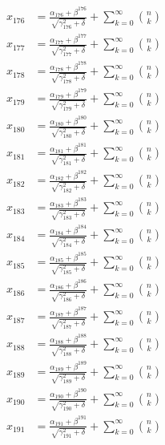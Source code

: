 \documentclass{article}
\begin{document}
\begin{align}
  x_{176} &= \frac{\alpha_{176} + \beta^{176}}{\sqrt{\gamma_{176}^2 + \delta}} + \sum_{k=0}^{\infty} \binom{n}{k} \label{eq:176} \\
  x_{177} &= \frac{\alpha_{177} + \beta^{177}}{\sqrt{\gamma_{177}^2 + \delta}} + \sum_{k=0}^{\infty} \binom{n}{k} \label{eq:177} \\
  x_{178} &= \frac{\alpha_{178} + \beta^{178}}{\sqrt{\gamma_{178}^2 + \delta}} + \sum_{k=0}^{\infty} \binom{n}{k} \label{eq:178} \\
  x_{179} &= \frac{\alpha_{179} + \beta^{179}}{\sqrt{\gamma_{179}^2 + \delta}} + \sum_{k=0}^{\infty} \binom{n}{k} \label{eq:179} \\
  x_{180} &= \frac{\alpha_{180} + \beta^{180}}{\sqrt{\gamma_{180}^2 + \delta}} + \sum_{k=0}^{\infty} \binom{n}{k} \label{eq:180} \\
  x_{181} &= \frac{\alpha_{181} + \beta^{181}}{\sqrt{\gamma_{181}^2 + \delta}} + \sum_{k=0}^{\infty} \binom{n}{k} \label{eq:181} \\
  x_{182} &= \frac{\alpha_{182} + \beta^{182}}{\sqrt{\gamma_{182}^2 + \delta}} + \sum_{k=0}^{\infty} \binom{n}{k} \label{eq:182} \\
  x_{183} &= \frac{\alpha_{183} + \beta^{183}}{\sqrt{\gamma_{183}^2 + \delta}} + \sum_{k=0}^{\infty} \binom{n}{k} \label{eq:183} \\
  x_{184} &= \frac{\alpha_{184} + \beta^{184}}{\sqrt{\gamma_{184}^2 + \delta}} + \sum_{k=0}^{\infty} \binom{n}{k} \label{eq:184} \\
  x_{185} &= \frac{\alpha_{185} + \beta^{185}}{\sqrt{\gamma_{185}^2 + \delta}} + \sum_{k=0}^{\infty} \binom{n}{k} \label{eq:185} \\
  x_{186} &= \frac{\alpha_{186} + \beta^{186}}{\sqrt{\gamma_{186}^2 + \delta}} + \sum_{k=0}^{\infty} \binom{n}{k} \label{eq:186} \\
  x_{187} &= \frac{\alpha_{187} + \beta^{187}}{\sqrt{\gamma_{187}^2 + \delta}} + \sum_{k=0}^{\infty} \binom{n}{k} \label{eq:187} \\
  x_{188} &= \frac{\alpha_{188} + \beta^{188}}{\sqrt{\gamma_{188}^2 + \delta}} + \sum_{k=0}^{\infty} \binom{n}{k} \label{eq:188} \\
  x_{189} &= \frac{\alpha_{189} + \beta^{189}}{\sqrt{\gamma_{189}^2 + \delta}} + \sum_{k=0}^{\infty} \binom{n}{k} \label{eq:189} \\
  x_{190} &= \frac{\alpha_{190} + \beta^{190}}{\sqrt{\gamma_{190}^2 + \delta}} + \sum_{k=0}^{\infty} \binom{n}{k} \label{eq:190} \\
  x_{191} &= \frac{\alpha_{191} + \beta^{191}}{\sqrt{\gamma_{191}^2 + \delta}} + \sum_{k=0}^{\infty} \binom{n}{k} \label{eq:191} \\

\end{align}
\end{document}
